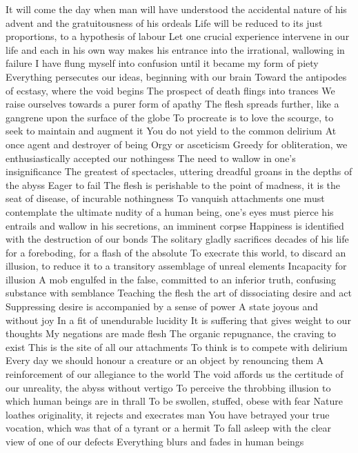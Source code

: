 \documentclass{article}
\begin{document}
It will come the day when man will have understood the accidental nature of his advent and the gratuitousness of his ordeals
Life will be reduced to its just proportions, to a hypothesis of labour
Let one crucial experience intervene in our life and each in his own way makes his entrance into the irrational, wallowing in failure
I have flung myself into confusion until it became my form of piety
Everything persecutes our ideas, beginning with our brain
Toward the antipodes of ecstasy, where the void begins
The prospect of death flings into trances
We raise ourselves towards a purer form of apathy
The flesh spreads further, like a gangrene upon the surface of the globe
To procreate is to love the scourge, to seek to maintain and augment it
You do not yield to the common delirium
At once agent and destroyer of being
Orgy or asceticism
Greedy for obliteration, we enthusiastically accepted our nothingess
The need to wallow in one's insignificance
The greatest of spectacles, uttering dreadful groans in the depths of the abyss
Eager to fail
The flesh is perishable to the point of madness, it is the seat of disease, of incurable nothingness
To vanquish attachments one must contemplate the ultimate nudity of a human being, one's eyes must pierce his entrails and wallow in his secretions, an imminent corpse
Happiness is identified with the destruction of our bonds
The solitary gladly sacrifices decades of his life for a foreboding, for a flash of the absolute
To execrate this world, to discard an illusion, to reduce it to a transitory assemblage of unreal elements
Incapacity for illusion
A mob engulfed in the false, committed to an inferior truth, confusing substance with semblance
Teaching the flesh the art of dissociating desire and act
Suppressing desire is accompanied by a sense of power
A state joyous and without joy
In a fit of unendurable lucidity
It is suffering that gives weight to our thoughts
My negations are made flesh
The organic repugnance, the craving to exist
This is the site of all our attachments
To think is to compete with delirium
Every day we should honour a creature or an object by renouncing them
A reinforcement of our allegiance to the world
The void affords us the certitude of our unreality, the abyss without vertigo
To perceive the throbbing illusion to which human beings are in thrall
To be swollen, stuffed, obese with fear
Nature loathes originality, it rejects and execrates man
You have betrayed your true vocation, which was that of a tyrant or a hermit
To fall asleep with the clear view of one of our defects
Everything blurs and fades in human beings
\end{document}
